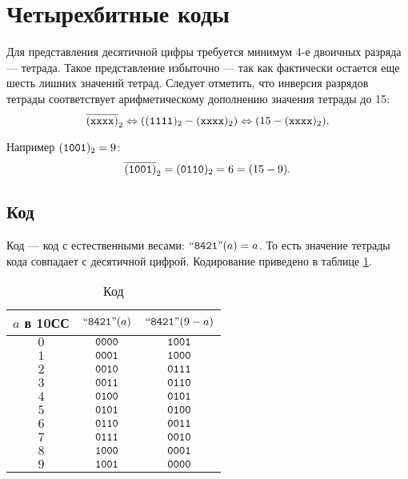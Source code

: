 \section{Четырехбитные коды}

Для представления десятичной цифры требуется минимум 4-е двоичных разряда --- тетрада. Такое представление избыточно --- так как фактически остается еще шесть лишних значений тетрад. Следует отметить, что инверсия разрядов тетрады соответствует арифметическому дополнению значения тетрады до 15:
\[
    \overline{(\texttt{xxxx})}_2 \Leftrightarrow \left((\texttt{1111})_2-(\texttt{xxxx})_2\right) \Leftrightarrow (15-(\texttt{xxxx})_2).
\]

Например $(\texttt{1001})_2=9$:
\[
    \overline{(\texttt{1001})}_2=(\texttt{0110})_2=6=(15-9).
\]


\subsection{Код \NaturalLabel}

Код \NaturalLabel --- код с естественными весами: $\text{``\texttt{8421}''}(a)=a$. То есть значение тетрады кода совпадает с десятичной цифрой. Кодирование приведено в таблице \ref{t:bcd:Natural}.

\begin{table}[!ht]
    \caption{Код \NaturalLabel}
    \label{t:bcd:Natural}
    \centering
    \begin{tabular}{|c|c|c|}
        \hline\hline
        $a$ в 10СС  & $\text{``\texttt{8421}''}(a)$         & $\text{``\texttt{8421}''}(9-a)$\\
        \hline\hline
        $0$         & $\texttt{0000}$       & $\texttt{1001}$ \\
        $1$         & $\texttt{0001}$       & $\texttt{1000}$ \\
        $2$         & $\texttt{0010}$       & $\texttt{0111}$ \\
        $3$         & $\texttt{0011}$       & $\texttt{0110}$ \\
        $4$         & $\texttt{0100}$       & $\texttt{0101}$ \\
        $5$         & $\texttt{0101}$       & $\texttt{0100}$ \\
        $6$         & $\texttt{0110}$       & $\texttt{0011}$ \\
        $7$         & $\texttt{0111}$       & $\texttt{0010}$ \\
        $8$         & $\texttt{1000}$       & $\texttt{0001}$ \\
        $9$         & $\texttt{1001}$       & $\texttt{0000}$ \\
        \hline
    \end{tabular}
\end{table}

